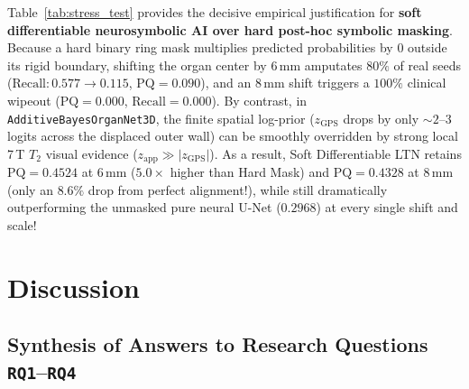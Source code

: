 \documentclass[10pt,a4paper]{article}
\renewcommand{\_}{\origunderscore\allowbreak}
\begin{document}
Table~\ref{tab:stress_test} provides the decisive empirical justification for \textbf{soft differentiable neurosymbolic AI over hard post-hoc symbolic masking}. Because a hard binary ring mask multiplies predicted probabilities by $0$ outside its rigid boundary, shifting the organ center by $6\,\text{mm}$ amputates $80\%$ of real seeds ($\text{Recall}: 0.577 \to 0.115$, $\text{PQ} = 0.090$), and an $8\,\text{mm}$ shift triggers a $100\%$ clinical wipeout ($\text{PQ} = 0.000$, $\text{Recall} = 0.000$). By contrast, in \texttt{AdditiveBayesOrganNet3D}, the finite spatial log-prior ($z_{\text{GPS}}$ drops by only $\sim 2\text{--}3$ logits across the displaced outer wall) can be smoothly overridden by strong local 7\,T $T_2$ visual evidence ($z_{\text{app}} \gg |z_{\text{GPS}}|$). As a result, Soft Differentiable LTN retains $\text{PQ} = \mathbf{0.4524}$ at $6\,\text{mm}$ ($5.0\times$ higher than Hard Mask) and $\text{PQ} = \mathbf{0.4328}$ at $8\,\text{mm}$ (only an $8.6\%$ drop from perfect alignment!), while still dramatically outperforming the unmasked pure neural U-Net ($0.2968$) at every single shift and scale!

\clearpage
\section{Discussion}
\label{sec:discussion}

\subsection{Synthesis of Answers to Research Questions \texttt{RQ1}--\texttt{RQ4}}
\label{sec:disc_rqs}
\end{document}
